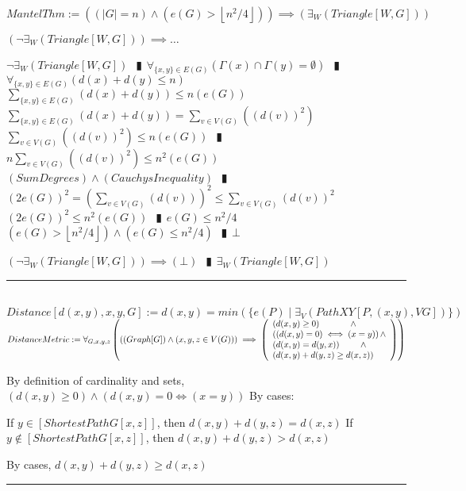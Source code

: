 \documentclass{book}
\newcommand{\abr}{:=}
\newcommand{\pipe}{$\phantom{(}\vrectangleblack\phantom{)}$}
\newcommand{\pr}[1]{\left(#1\right)}
\newcommand{\st}{\mathbin{|}}
\newcommand{\utup}[1]{\{#1\}}
\newcommand{\floor}[1]{\left\lfloor #1 \right\rfloor}
\begin{document}
$MantelThm \abr \pr{(|G| = n) \land \pr{e(G) > \floor{n^2 / 4}}} \implies \pr{\exists_{W}(Triangle[W, G])}$
\begin{enumerate}
  \lit $\pr{\lnot \exists_{W}(Triangle[W, G])} \implies \ldots$
  \begin{enumerate}
    \lit $\lnot \exists_{W}(Triangle[W, G])$ \pipe $\forall_{\utup{x, y} \in E(G)}\pr{\Gamma(x) \cap \Gamma(y) = \emptyset}$ \pipe $\forall_{\utup{x, y} \in E(G)}\pr{d(x) + d(y) \leq n}$
    \lit $\sum \limits_{\utup{x, y} \in E(G)}^{ }\pr{d(x) + d(y)} \leq n \pr{e(G)}$
    \lit $\sum \limits_{\utup{x, y} \in E(G)}^{ }\pr{d(x) + d(y)} = \sum \limits_{v \in V(G)}^{ }\pr{\pr{d(v)}^2}$
    \lit $\sum \limits_{v \in V(G)}^{ }\pr{\pr{d(v)}^2} \leq n \pr{e(G)}$ \pipe $n \sum \limits_{v \in V(G)}^{ }\pr{\pr{d(v)}^2} \leq n^2 \pr{e(G)}$
    \lit $(SumDegrees) \land (CauchysInequality)$ \pipe $\pr{2 e(G)}^2 = \pr{\sum \limits_{v \in V(G)}\pr{d(v)}}^2 \leq \sum \limits_{v \in V(G)}\pr{d(v)}^2$ %
    \lit $\pr{2 e(G)}^2 \leq n^2 \pr{e(G)}$ \pipe $e(G) \leq n^2 /4$
    \lit $\pr{e(G) > \floor{n^2 / 4}} \land \pr{e(G) \leq n^2 /4}$ \pipe $\bot$
  \end{enumerate}
  \lit $\pr{\lnot \exists_{W}(Triangle[W, G])} \implies (\bot)$ \pipe $\exists_{W}(Triangle[W, G])$
\end{enumerate} \vspace{.75mm} \hrule \vspace{.75mm} \ \\

$Distance[d(x, y), x, y, G] \abr d(x, y) = min\pr{\{e(P) \st \exists_{V}\pr{PathXY[P, (x, y), V G]}\}}$ \\
$DistanceMetric \abr \forall_{G, x, y, z}\pr{\pr{(Graph[G]) \land \pr{x, y, z \in V(G)}} \implies
\left(\begin{array}{ll}
  \pr{d(x, y) \geq 0} \hfill \land \hfill \\
  \pr{\pr{d(x, y) = 0} \iff (x = y)} \hfill \land \hfill \\
  \pr{d(x, y) = d(y, x)} \hfill \land \hfill \\
  \pr{d(x, y) + d(y, z) \geq d(x, z)} \\
\end{array}\right)}$ \\
\begin{enumerate}
  \lit By definition of cardinality and sets, $\pr{d(x, y) \geq 0} \land \pr{d(x, y) = 0 \iff (x = y)}$
  \lit By cases:
  \begin{enumerate}
    \lit If $y \in [ShortestPathG[x, z]]$, then $d(x, y) + d(y, z) = d(x, z)$
    \lit If $y \notin [ShortestPathG[x, z]]$, then $d(x, y) + d(y, z) > d(x, z)$
  \end{enumerate}
  \lit By cases, $d(x, y) + d(y, z) \geq d(x, z)$
\end{enumerate} \vspace{.75mm} \hrule \vspace{.75mm} \ \\
\end{document}
